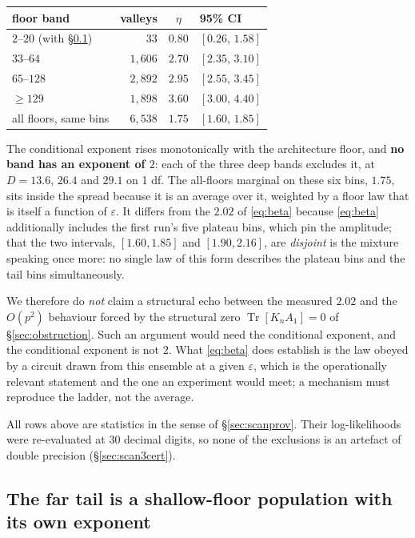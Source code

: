 \documentclass[11pt,a4paper]{article}
\theoremstyle{definition}
\theoremstyle{remark}
\DeclareMathOperator{\Tr}{Tr}
\begin{document}
\begin{center}\footnotesize
\begin{tabular}{@{}lrcl@{}}
\toprule
floor band & valleys & $\eta$ & 95\% CI\\
\midrule
$2$--$20$ (with \S\ref{sec:fartail}) & $33$ & $0.80$ & $[0.26,\,1.58]$\\
$33$--$64$ & $1{,}606$ & $2.70$ & $[2.35,\,3.10]$\\
$65$--$128$ & $2{,}892$ & $2.95$ & $[2.55,\,3.45]$\\
$\ge 129$ & $1{,}898$ & $3.60$ & $[3.00,\,4.40]$\\
\midrule
all floors, same bins & $6{,}538$ & $1.75$ & $[1.60,\,1.85]$\\
\bottomrule
\end{tabular}
\end{center}

\noindent The conditional exponent rises monotonically with the architecture floor, and \textbf{no band has an exponent of $2$}: each of the three deep bands excludes it, at $D = 13.6$, $26.4$ and $29.1$ on 1 df. The all-floors marginal on these six bins, $1.75$, sits inside the spread because it is an average over it, weighted by a floor law that is itself a function of $\varepsilon$. It differs from the $2.02$ of \eqref{eq:beta} because \eqref{eq:beta} additionally includes the first run's five plateau bins, which pin the amplitude; that the two intervals, $[1.60, 1.85]$ and $[1.90, 2.16]$, are \emph{disjoint} is the mixture speaking once more: no single law of this form describes the plateau bins and the tail bins simultaneously.

We therefore do \emph{not} claim a structural echo between the measured $2.02$ and the $O(p^2)$ behaviour forced by the structural zero $\Tr[K_nA_1] = 0$ of \S\ref{sec:obstruction}. Such an argument would need the conditional exponent, and the conditional exponent is not $2$. What \eqref{eq:beta} does establish is the law obeyed by a circuit drawn from this ensemble at a given $\varepsilon$, which is the operationally relevant statement and the one an experiment would meet; a mechanism must reproduce the ladder, not the average.

All rows above are statistics in the sense of \S\ref{sec:scanprov}. Their log-likelihoods were re-evaluated at 30 decimal digits, so none of the exclusions is an artefact of double precision (\S\ref{sec:scan3cert}).

\subsection{The far tail is a shallow-floor population with its own exponent}\label{sec:fartail}
\end{document}
